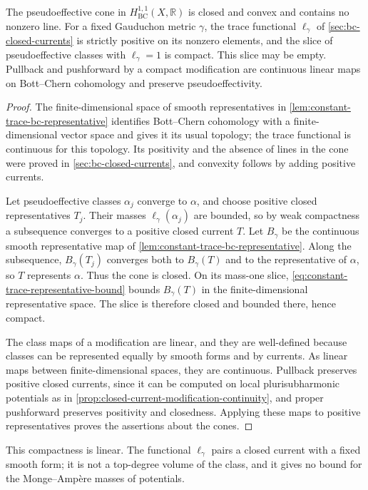 \begin{proposition}\label{prop:psef-cone-compact-base}
The pseudoeffective cone in $H^{1,1}_{\mathrm{BC}}(X,\mathbb R)$ is closed and convex and contains no nonzero line. For a fixed Gauduchon metric $\gamma$, the trace functional $\ell_\gamma$ of \cref{sec:bc-closed-currents} is strictly positive on its nonzero elements, and the slice of pseudoeffective classes with $\ell_\gamma=1$ is compact. This slice may be empty. Pullback and pushforward by a compact modification are continuous linear maps on Bott--Chern cohomology and preserve pseudoeffectivity.
\end{proposition}
\begin{proof}
The finite-dimensional space of smooth representatives in \cref{lem:constant-trace-bc-representative} identifies Bott--Chern cohomology with a finite-dimensional vector space and gives it its usual topology; the trace functional is continuous for this topology. Its positivity and the absence of lines in the cone were proved in \cref{sec:bc-closed-currents}, and convexity follows by adding positive currents.

Let pseudoeffective classes $\alpha_j$ converge to $\alpha$, and choose positive closed representatives $T_j$. Their masses $\ell_\gamma(\alpha_j)$ are bounded, so by weak compactness a subsequence converges to a positive closed current $T$. Let $B_\gamma$ be the continuous smooth representative map of \cref{lem:constant-trace-bc-representative}. Along the subsequence, $B_\gamma(T_j)$ converges both to $B_\gamma(T)$ and to the representative of $\alpha$, so $T$ represents $\alpha$. Thus the cone is closed. On its mass-one slice, \eqref{eq:constant-trace-representative-bound} bounds $B_\gamma(T)$ in the finite-dimensional representative space. The slice is therefore closed and bounded there, hence compact.

The class maps of a modification are linear, and they are well-defined because classes can be represented equally by smooth forms and by currents. As linear maps between finite-dimensional spaces, they are continuous. Pullback preserves positive closed currents, since it can be computed on local plurisubharmonic potentials as in \cref{prop:closed-current-modification-continuity}, and proper pushforward preserves positivity and closedness. Applying these maps to positive representatives proves the assertions about the cones.
\end{proof}

This compactness is linear. The functional $\ell_\gamma$ pairs a closed current with a fixed smooth form; it is not a top-degree volume of the class, and it gives no bound for the Monge--Amp\`ere masses of potentials.
